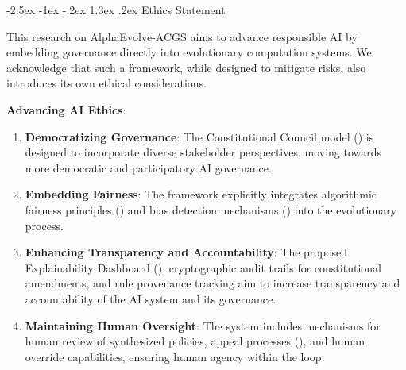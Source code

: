 \documentclass[manuscript,screen,review,anonymous,9pt]{acmart}
\makeatletter
\renewcommand\section{\@startsection{section}{1}{\z@}%
  {-2.5ex \@plus -1ex \@minus -.2ex}%
  {1.3ex \@plus.2ex}%
  {\normalfont\Large\bfseries}}
\makeatother
\begin{document}

\section{Ethics Statement}
\label{sec:ethics}

This research on AlphaEvolve-ACGS aims to advance responsible AI by embedding governance directly into evolutionary computation systems. We acknowledge that such a framework, while designed to mitigate risks, also introduces its own ethical considerations.

\textbf{Advancing AI Ethics}:
\begin{enumerate}
	\item \textbf{Democratizing Governance}: The Constitutional Council model () is designed to incorporate diverse stakeholder perspectives, moving towards more democratic and participatory AI governance.
	\item \textbf{Embedding Fairness}: The framework explicitly integrates algorithmic fairness principles () and bias detection mechanisms () into the evolutionary process.
	\item \textbf{Enhancing Transparency and Accountability}: The proposed Explainability Dashboard (), cryptographic audit trails for constitutional amendments, and rule provenance tracking aim to increase transparency and accountability of the AI system and its governance.
	\item \textbf{Maintaining Human Oversight}: The system includes mechanisms for human review of synthesized policies, appeal processes (), and human override capabilities, ensuring human agency within the loop.
\end{enumerate}
\end{document}

